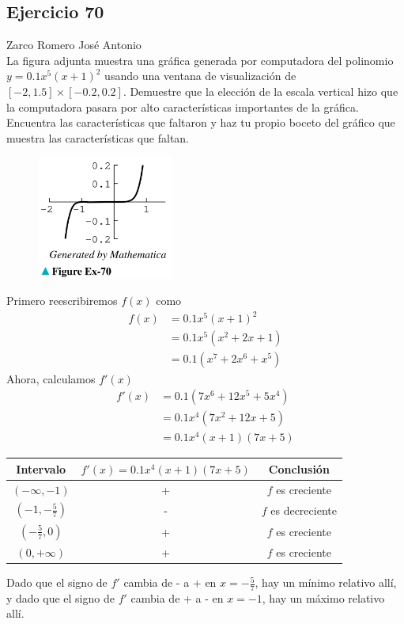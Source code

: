 \documentclass[12pt]{article}
\begin{document}
\subsection{Ejercicio 70} Zarco Romero José Antonio \\

La figura adjunta muestra una gráfica generada por computadora del polinomio $y = 0.1x^5 (x + 1)^2$ usando una ventana de visualización de $[−2, 1.5] \times [−0.2, 0.2]$. Demuestre que la elección de la escala vertical hizo que la computadora pasara por alto características importantes de la gráfica. Encuentra las características que faltaron y haz tu propio boceto del gráfico que muestra las características que faltan.
\begin{figure}[H]
\centering
\includegraphics[width=0.4\textwidth]{../img/img_Lista3/2_70.png}
\end{figure}
Primero reescribiremos $f(x)$ como
\begin{align*}
  f(x)
  &=0.1x^5 (x + 1)^2 \\
  &= 0.1x^5(x^2+2x+1)\\
  &= 0.1(x^7+2x^6+x^5)
\end{align*}
Ahora, calculamos $f'(x)$
\begin{align*}
  f'(x)
  &= 0.1(7x^6+12x^5+5x^4)\\
  &= 0.1x^4(7x^2+12x+5)\\
  &=0.1x^4(x+1)(7x+5)
\end{align*}

\begin{table}[H]
  \centering
  \begin{tabular}{c|c|c}
    \hline
    Intervalo & $f'(x) = 0.1x^4(x+1)(7x+5)$ & Conclusión \\
    \hline
    $(-\infty,-1)$ & + & $f$ es creciente \\
    $(-1,-\frac{5}{7})$ & - & $f$ es decreciente \\
    $(-\frac{5}{7},0)$ & + & $f$ es creciente\\
    $(0,+\infty)$ & + & $f$ es creciente\\
    \hline
  \end{tabular}
\end{table}
Dado que el signo de $f'$ cambia de - a + en $x=-\frac{5}{7}$, hay un mínimo relativo allí, y
dado que el signo de $f'$ cambia de + a - en $x=-1$, hay un máximo relativo allí.
\end{document}
